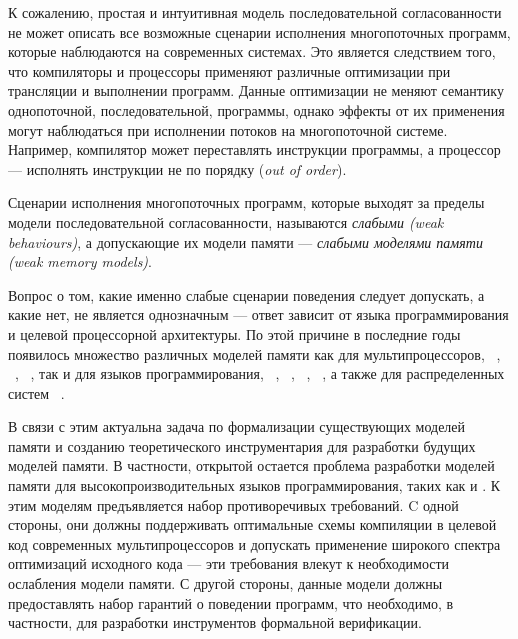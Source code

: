 К сожалению, простая и интуитивная модель последовательной согласованности 
не может описать все возможные сценарии исполнения многопоточных программ, 
которые наблюдаются на современных системах.
Это является следствием того, что компиляторы и процессоры применяют 
различные оптимизации при трансляции и выполнении программ.
Данные оптимизации не меняют семантику однопоточной, последовательной, программы, 
однако эффекты от их применения могут наблюдаться при исполнении потоков на многопоточной системе.
Например, компилятор может переставлять инструкции программы, 
а процессор --- исполнять инструкции не по порядку (\emph{out of order}).

Сценарии исполнения многопоточных программ, 
которые выходят за пределы модели последовательной согласованности,
называются \emph{слабыми (weak behaviours)}, а допускающие их модели памяти ---
\emph{слабыми моделями памяти (weak memory models)}.

Вопрос о том, какие именно слабые сценарии поведения 
следует допускать, а какие нет, не является однозначным --- ответ  
зависит от языка программирования и целевой процессорной архитектуры.
По этой причине в последние годы появилось множество
различных моделей памяти как для мультипроцессоров, \Intel~\autocite{Sewell-al:CACM10}, 
\ARM~\autocite{Pulte-al:POPL18}, 
\POWER~\autocite{Sarkar-al:PLDI11}, так и для языков программирования,
\CPP~\autocite{Batty-al:POPL11},
\Java~\autocite{Manson-al:POPL05}, 
\JS~\autocite{Watt-al:PLDI2020}, 
\OCaml~\autocite{Dolan-al:PLDI18},
а также для распределенных систем%
~\autocite{Jagadeesan-al:ESOP2018,Lahav-Boker:PLDI2020}.

В связи с этим актуальна задача по формализации 
существующих моделей памяти и созданию теоретического инструментария
для разработки будущих моделей памяти. В частности,  открытой остается проблема разработки моделей памяти
для высокопроизводительных языков программирования, таких как \CPP и \Java.
К этим моделям предъявляется набор противоречивых требований.
C одной стороны, они должны поддерживать оптимальные схемы компиляции в
целевой код современных мультипроцессоров и допускать применение
широкого спектра оптимизаций исходного кода --- эти требования
влекут к необходимости ослабления модели памяти.
С другой стороны, данные модели должны предоставлять набор
гарантий о поведении программ, что необходимо, в частности, для разработки инструментов
формальной верификации.

